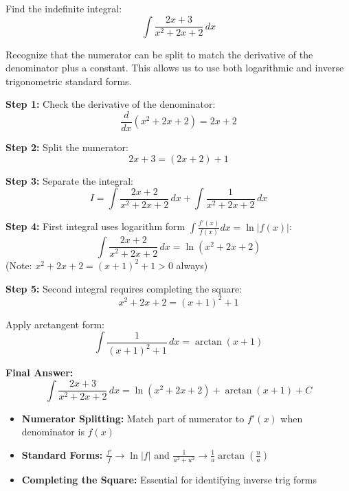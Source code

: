 \begin{problem}
Find the indefinite integral:
\[
\int \frac{2x+3}{x^2+2x+2} \, dx
\]
\end{problem}

\begin{hint}
Recognize that the numerator can be split to match the derivative of the denominator plus a constant. This allows us to use both logarithmic and inverse trigonometric standard forms.
\end{hint}

\begin{solution}
\textbf{Step 1:} Check the derivative of the denominator:
\[
\frac{d}{dx}(x^2+2x+2) = 2x+2
\]

\textbf{Step 2:} Split the numerator:
\[
2x+3 = (2x+2) + 1
\]

\textbf{Step 3:} Separate the integral:
\[
I = \int \frac{2x+2}{x^2+2x+2} \, dx + \int \frac{1}{x^2+2x+2} \, dx
\]

\textbf{Step 4:} First integral uses logarithm form $\int \frac{f'(x)}{f(x)} dx = \ln|f(x)|$:
\[
\int \frac{2x+2}{x^2+2x+2} \, dx = \ln(x^2+2x+2)
\]
(Note: $x^2+2x+2 = (x+1)^2 + 1 > 0$ always)

\textbf{Step 5:} Second integral requires completing the square:
\[
x^2+2x+2 = (x+1)^2 + 1
\]

Apply arctangent form:
\[
\int \frac{1}{(x+1)^2 + 1} \, dx = \arctan(x+1)
\]

\textbf{Final Answer:}
\[
\boxed{\int \frac{2x+3}{x^2+2x+2} \, dx = \ln(x^2+2x+2) + \arctan(x+1) + C}
\]
\end{solution}

\begin{takeaways}
\begin{itemize}
\item \textbf{Numerator Splitting:} Match part of numerator to $f'(x)$ when denominator is $f(x)$
\item \textbf{Standard Forms:} $\frac{f'}{f} \to \ln|f|$ and $\frac{1}{a^2+u^2} \to \frac{1}{a}\arctan(\frac{u}{a})$
\item \textbf{Completing the Square:} Essential for identifying inverse trig forms
\end{itemize}
\end{takeaways}

\vspace{1.5cm}


